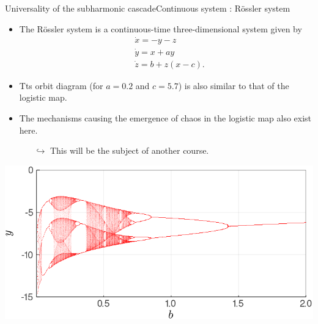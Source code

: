 \documentclass[usenames,dvipsnames,svgnames,10pt,aspectratio=169]{beamer}
\begin{document}
\begin{frame}[t, c]{Universality of the subharmonic cascade}{Continuous system : R\"ossler system}
	\begin{minipage}{.48\textwidth}
		\begin{itemize}
			\item The R\"ossler system is a continuous-time three-dimensional system given by
			\[
				\begin{aligned}
					& \dot{x} = -y - z \\
					& \dot{y} = x + ay \\
					& \dot{z} = b + z \left( x - c \right).
				\end{aligned}
			\]

			\item Tts orbit diagram (for \( a = 0.2 \) and \( c = 5.7 \)) is also similar to that of the logistic map.

			\medskip

			\item The mechanisms causing the emergence of chaos in the logistic map also exist here.
			\begin{itemize}
				\item[\( \hookrightarrow \)] This will be the subject of another course.
			\end{itemize}
		\end{itemize}
	\end{minipage}%
	\hfill
	\begin{minipage}{.48\textwidth}
		\includegraphics[width=\textwidth]{rossler_orbit_diagram}
	\end{minipage}

	\vspace{1cm}
\end{frame}

\thanksframe
\end{document}
